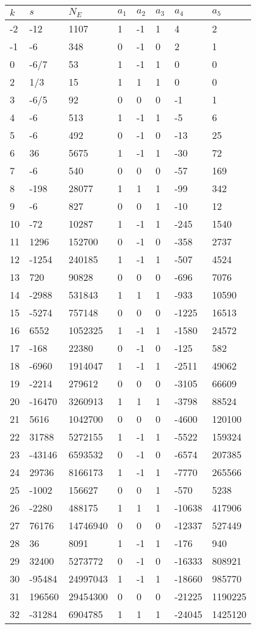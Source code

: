 \documentclass{amsart}
\begin{document}
\begin{longtable}{|l|l|l|lllll|}
\hline
$k$ & $s$ & $N_E$ & $a_1$ & $a_2$ & $a_3$ & $a_4$ & $a_5$\\
\hline
-2&-12&1107&1&-1&1&4&2\\
-1&-6&348&0&-1&0&2&1\\
0&-6/7&53&1&-1&1&0&0\\
2&1/3&15&1&1&1&0&0\\
3&-6/5&92&0&0&0&-1&1\\
4&-6&513&1&-1&1&-5&6\\
5&-6&492&0&-1&0&-13&25\\
6&36&5675&1&-1&1&-30&72\\
7&-6&540&0&0&0&-57&169\\
8&-198&28077&1&1&1&-99&342\\
9&-6&827&0&0&1&-10&12\\
10&-72&10287&1&-1&1&-245&1540\\
11&1296&152700&0&-1&0&-358&2737\\
12&-1254&240185&1&-1&1&-507&4524\\
13&720&90828&0&0&0&-696&7076\\
14&-2988&531843&1&1&1&-933&10590\\
15&-5274&757148&0&0&0&-1225&16513\\
16&6552&1052325&1&-1&1&-1580&24572\\
17&-168&22380&0&-1&0&-125&582\\
18&-6960&1914047&1&-1&1&-2511&49062\\
19&-2214&279612&0&0&0&-3105&66609\\
20&-16470&3260913&1&1&1&-3798&88524\\
21&5616&1042700&0&0&0&-4600&120100\\
22&31788&5272155&1&-1&1&-5522&159324\\
23&-43146&6593532&0&-1&0&-6574&207385\\
24&29736&8166173&1&-1&1&-7770&265566\\
25&-1002&156627&0&0&1&-570&5238\\
26&-2280&488175&1&1&1&-10638&417906\\
27&76176&14746940&0&0&0&-12337&527449\\
28&36&8091&1&-1&1&-176&940\\
29&32400&5273772&0&-1&0&-16333&808921\\
30&-95484&24997043&1&-1&1&-18660&985770\\
31&196560&29454300&0&0&0&-21225&1190225\\
32&-31284&6904785&1&1&1&-24045&1425120\\

\end{longtable}
\end{document}
